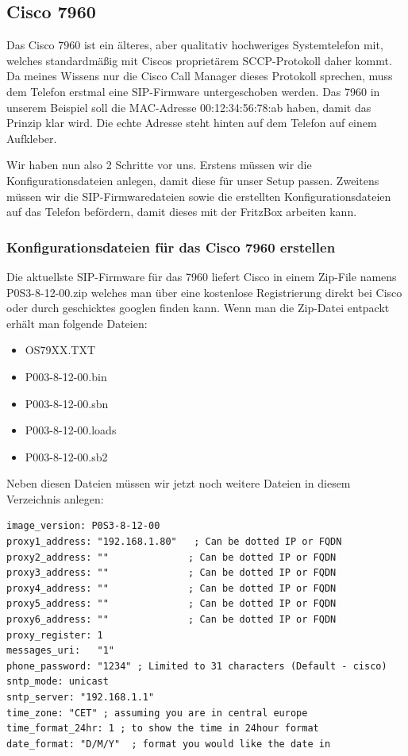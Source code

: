 \documentclass[a4paper,12pt]{scrbook}
\begin{document}
\subsection{Cisco 7960}
Das Cisco 7960 ist ein älteres, aber qualitativ hochweriges Systemtelefon mit, welches standardmäßig mit Ciscos proprietärem SCCP-Protokoll daher kommt. Da meines Wissens nur die Cisco Call Manager dieses Protokoll 
sprechen, muss dem Telefon erstmal eine SIP-Firmware untergeschoben werden. Das 7960 in unserem Beispiel soll die MAC-Adresse 00:12:34:56:78:ab haben, damit das Prinzip klar wird. Die echte Adresse steht hinten auf dem Telefon auf 
einem Aufkleber. 

Wir haben nun also 2 Schritte vor uns. Erstens müssen wir die Konfigurationsdateien anlegen, damit diese für unser Setup passen. Zweitens müssen wir die SIP-Firmwaredateien sowie die erstellten Konfigurationsdateien 
auf das Telefon befördern, damit dieses mit der FritzBox arbeiten kann.

\subsubsection{Konfigurationsdateien für das Cisco 7960 erstellen}

Die aktuellste SIP-Firmware für das 7960 liefert Cisco in einem Zip-File namens P0S3-8-12-00.zip welches man über eine kostenlose Registrierung
direkt bei Cisco oder durch geschicktes googlen finden kann. Wenn man die Zip-Datei entpackt erhält man folgende Dateien:
\begin{itemize}
 \item OS79XX.TXT
 \item P003-8-12-00.bin
 \item P003-8-12-00.sbn
 \item P003-8-12-00.loads
 \item P003-8-12-00.sb2
\end{itemize}

Neben diesen Dateien müssen wir jetzt noch weitere Dateien in diesem Verzeichnis anlegen:

\begin{lstlisting}[caption={SIPDefault.cnf},label=lst:7960sipdefaultcnf]
image_version: P0S3-8-12-00
proxy1_address: "192.168.1.80"   ; Can be dotted IP or FQDN
proxy2_address: ""              ; Can be dotted IP or FQDN
proxy3_address: ""              ; Can be dotted IP or FQDN
proxy4_address: ""              ; Can be dotted IP or FQDN
proxy5_address: ""              ; Can be dotted IP or FQDN
proxy6_address: ""              ; Can be dotted IP or FQDN
proxy_register: 1
messages_uri:   "1"
phone_password: "1234" ; Limited to 31 characters (Default - cisco)
sntp_mode: unicast
sntp_server: "192.168.1.1" 
time_zone: "CET" ; assuming you are in central europe
time_format_24hr: 1 ; to show the time in 24hour format
date_format: "D/M/Y"  ; format you would like the date in
\end{lstlisting}
\end{document}
